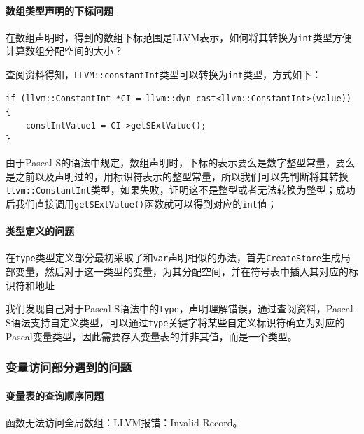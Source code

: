 \documentclass[lang=cn,11pt,a4paper,cite=authornum]{paper}
\begin{document}
\paragraph{数组类型声明的下标问题}

在数组声明时，得到的数组下标范围是LLVM表示，如何将其转换为\texttt{int}类型方便计算数组分配空间的大小？

查阅资料得知，\texttt{LLVM::constantInt}类型可以转换为\texttt{int}类型，方式如下：

\begin{code}
    \begin{verbatim}
if (llvm::ConstantInt *CI = llvm::dyn_cast<llvm::ConstantInt>(value))
{
    constIntValue1 = CI->getSExtValue();
}
\end{verbatim}
\end{code}

由于Pascal-S的语法中规定，数组声明时，下标的表示要么是数字整型常量，要么是之前以及声明过的，用标识符表示的整型常量，所以我们可以先判断将其转换\texttt{llvm::ConstantInt}类型，如果失败，证明这不是整型或者无法转换为整型；成功后我们直接调用\texttt{getSExtValue()}函数就可以得到对应的\texttt{int}值；

\paragraph{类型定义的问题}

在\texttt{type}类型定义部分最初采取了和\texttt{var}声明相似的办法，首先\texttt{CreateStore}生成局部变量，然后对于这一类型的变量，为其分配空间，并在符号表中插入其对应的标识符和地址

我们发现自己对于Pascal-S语法中的\texttt{type}，声明理解错误，通过查阅资料，Pascal-S语法支持自定义类型，可以通过\texttt{type}关键字将某些自定义标识符确立为对应的Pascal变量类型，因此需要存入变量表的并非其值，而是一个类型。

\subsubsection{变量访问部分遇到的问题}

\paragraph{变量表的查询顺序问题}

函数无法访问全局数组：LLVM报错：Invalid Record。
\end{document}
